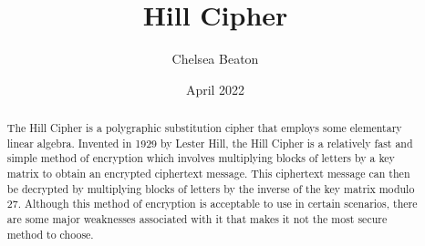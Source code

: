 \documentclass{article}
\title{Hill Cipher}
\author{Chelsea Beaton}
\date{April 2022}
\begin{document}
\maketitle
\begin{abstract}
    The Hill Cipher is a polygraphic substitution cipher that employs some elementary linear algebra. Invented in 1929 by Lester Hill, the Hill Cipher is a relatively fast and simple method of encryption which involves multiplying blocks of letters by a key matrix to obtain an encrypted ciphertext message. This ciphertext message can then be decrypted by multiplying blocks of letters by the inverse of the key matrix modulo $27$. Although this method of encryption is acceptable to use in certain scenarios, there are some major weaknesses associated with it that makes it not the most secure method to choose.
\end{abstract}
\end{document}
